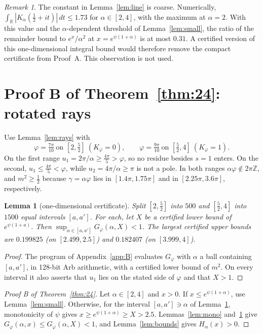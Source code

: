 \documentclass[11pt,a4paper]{article}
\theoremstyle{plain}
\newtheorem{lemma}[theorem]{Lemma}
\theoremstyle{remark}
\newtheorem*{remark}{Remark}
\newcommand{\R}{\mathbb R}
\newcommand{\Z}{\mathbb Z}
\begin{document}
\begin{remark}
The constant in Lemma~\ref{lem:line} is coarse. Numerically,
$\int_\R|K_\alpha(\frac12+it)|\,dt\le1.73$ for $\alpha\in[2,4]$, with the maximum at $\alpha=2$.
With this value and the $\alpha$-dependent threshold of Lemma~\ref{lem:small}, the ratio of the
remainder bound to $e^x/\alpha^2$ at $x=e^{\psi(1+\alpha)}$ is at most $0.31$. A certified version of
this one-dimensional integral bound would therefore remove the compact certificate from Proof~A.
This observation is not used.
\end{remark}

\section{Proof B of Theorem~\ref{thm:24}: rotated rays}\label{sec:B}
Use Lemma~\ref{lem:rays} with
\[
 \varphi=\tfrac{7\pi}{10}\ \text{on }[2,\tfrac52]\ (K_\varphi=0),\qquad
 \varphi=\tfrac{9\pi}{10}\ \text{on }[\tfrac52,4]\ (K_\varphi=1).
\]
On the first range $u_1=2\pi/\alpha\ge\frac{4\pi}5>\varphi$, so no residue besides $s=1$ enters. On
the second, $u_1\le\frac{4\pi}5<\varphi$, while $u_2=4\pi/\alpha\ge\pi$ is not a pole. In both
ranges $\alpha\varphi\notin2\pi\Z$, and $m^2\ge\frac12$ because $\gamma=\alpha\varphi$ lies in
$[1.4\pi,1.75\pi]$ and in $[2.25\pi,3.6\pi]$, respectively.

\begin{lemma}[one-dimensional certificate]\label{lem:certB}
Split $[2,\frac52]$ into $500$ and $[\frac52,4]$ into $1500$ equal intervals $[a,a']$. For each,
let $X$ be a certified lower bound of $e^{\psi(1+a)}$. Then
$\sup_{\alpha\in[a,a']}G_\varphi(\alpha,X)<1$. The largest certified upper bounds are $0.199825$
(on $[2.499,2.5]$) and $0.182407$ (on $[3.999,4]$).
\end{lemma}
\begin{proof}
The program of Appendix~\ref{app:B} evaluates $G_\varphi$ with $\alpha$ a ball containing $[a,a']$,
in 128-bit Arb arithmetic, with a certified lower bound of $m^2$. On every interval it also
asserts that $u_1$ lies on the stated side of $\varphi$ and that $X>1$.
\end{proof}

\begin{proof}[Proof B of Theorem~\ref{thm:24}]
Let $\alpha\in[2,4]$ and $x>0$. If $x\le e^{\psi(1+\alpha)}$, use Lemma~\ref{lem:small}. Otherwise,
for the interval $[a,a']\ni\alpha$ of Lemma~\ref{lem:certB}, monotonicity of $\psi$ gives
$x\ge e^{\psi(1+\alpha)}\ge X>2.5$. Lemmas~\ref{lem:mono} and~\ref{lem:certB} give
$G_\varphi(\alpha,x)\le G_\varphi(\alpha,X)<1$, and Lemma~\ref{lem:bounds} gives $H_\alpha(x)>0$.
\end{proof}
\end{document}
